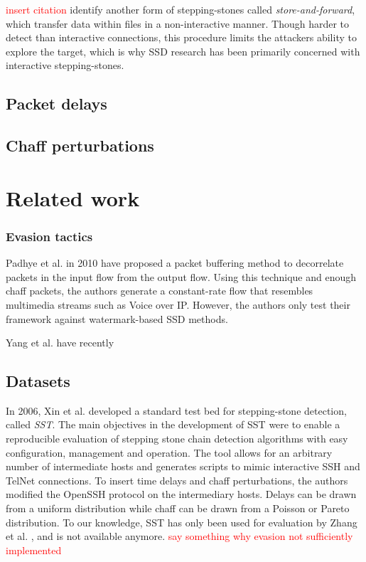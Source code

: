 \documentclass[runningheads]{llncs}\usepackage[]{graphicx}\usepackage[]{color}
\begin{document}
\textcolor{red}{insert citation} identify another form of stepping-stones called \textit{store-and-forward}, which transfer data within files in a non-interactive manner. Though harder to detect than interactive connections, this procedure limits the attackers ability to explore the target, which is why SSD research has been primarily concerned with interactive stepping-stones.

\subsection{Packet delays}

\subsection{Chaff perturbations}



\section{Related work}\label{Sec:Relatedwork}

\subsubsection{Evasion tactics}

Padhye et al. \cite{padhye2010evading} in 2010 have proposed a packet buffering method to decorrelate packets in the input flow from the output flow. Using this technique and enough chaff packets, the authors generate a constant-rate flow that resembles multimedia streams such as Voice over IP. However, the authors only test their framework against watermark-based SSD methods. 

Yang et al. \cite{yang2018sniffing} have recently 

\subsection{Datasets}


In 2006, Xin et al. \cite{xin2006testbed} developed a standard test bed for stepping-stone detection, called \textit{SST}. 
The main objectives in the development of SST were to enable a reproducible evaluation of stepping stone chain detection algorithms with easy configuration, management and operation. The tool allows for an arbitrary number of intermediate hosts and generates scripts to mimic interactive SSH and TelNet connections. 
To insert time delays and chaff perturbations, the authors modified the OpenSSH protocol on the intermediary hosts. Delays can be drawn from a uniform distribution while chaff can be drawn from a Poisson or Pareto distribution. To our knowledge, SST has only been used for evaluation by Zhang et al. \cite{zhang2005stepping}, and is not available anymore. \textcolor{red}{say something why evasion not sufficiently implemented}
\end{document}
